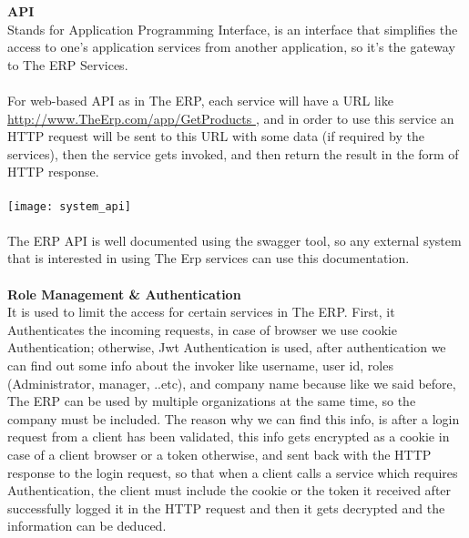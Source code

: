 \begin{adjustwidth}{2cm}{}

    \textbf{API}\\
        Stands for Application Programming Interface, is an interface that simplifies the access to
one’s application services from another application, so it’s the gateway to The ERP
Services.\\\\
For web-based API as in The ERP, each service will have a URL like \url{http://www.TheErp.com/app/GetProducts }, and in order to use this service an HTTP request will
be sent to this URL with some data (if required by the services), then the service gets invoked,
and then return the result in the form of HTTP response.\\\\
\texttt{[image: system\_api]}\\\\
The ERP API is well documented using the swagger tool, so any external system that is
interested in using The Erp services can use this documentation.\\\\

    \textbf{Role Management \& Authentication}\\
        It is used to limit the access for certain services in The ERP.
        First, it Authenticates the incoming requests, in case of browser we use cookie
        Authentication; otherwise, Jwt Authentication is used, after authentication we can find out
        some info about the invoker like username, user id, roles (Administrator, manager, ..etc), and
        company name because like we said before, The ERP can be used by multiple organizations
        at the same time, so the company must be included. The reason why we can find this info, is
        after a login request from a client has been validated, this info gets encrypted as a cookie in
        case of a client browser or a token otherwise, and sent back with the HTTP response to the
        login request, so that when a client calls a service which requires Authentication, the client
        must include the cookie or the token it received after successfully logged it in the HTTP
        request and then it gets decrypted and the information can be deduced.\\\\


\end{adjustwidth}
